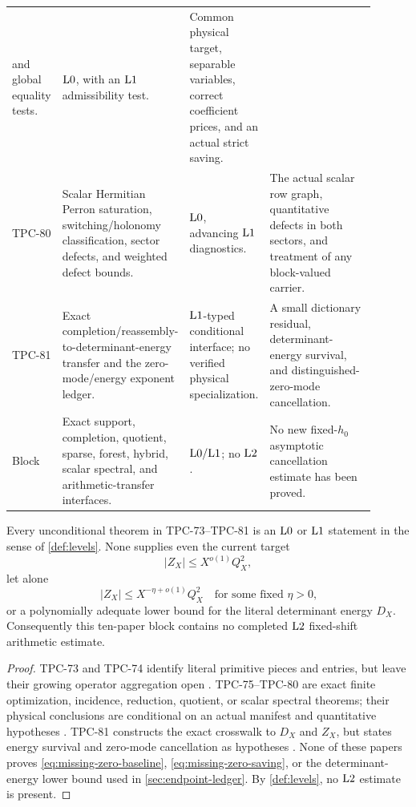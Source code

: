 \begin{longtable}{@{}p{0.075\linewidth}p{0.34\linewidth}
 p{0.135\linewidth}p{0.355\linewidth}@{}}
and global equality tests. &
\(\mathrm{L0}\), with an \(\mathrm{L1}\) admissibility test. &
Common physical target, separable variables, correct coefficient
prices, and an actual strict saving.
\\
TPC-80 &
Scalar Hermitian Perron saturation, switching/holonomy
classification, sector defects, and weighted defect bounds. &
\(\mathrm{L0}\), advancing \(\mathrm{L1}\) diagnostics. &
The actual scalar row graph, quantitative defects in both sectors,
and treatment of any block-valued carrier.
\\
TPC-81 &
Exact completion/reassembly-to-determinant-energy transfer and the
zero-mode/energy exponent ledger. &
\(\mathrm{L1}\)-typed conditional interface; no verified physical
specialization. &
A small dictionary residual, determinant-energy survival, and
distinguished-zero-mode cancellation.
\\
\midrule
Block &
Exact support, completion, quotient, sparse, forest, hybrid, scalar
spectral, and arithmetic-transfer interfaces. &
\(\mathrm{L0}/\mathrm{L1}\); no \(\mathrm{L2}\). &
No new fixed-\(h_0\) asymptotic cancellation estimate has been
proved.
\\
\bottomrule
\end{longtable}
\endgroup

\begin{theorem}
\label{thm:stage-audit}
Every unconditional theorem in TPC-73--TPC-81 is an \(\mathrm{L0}\) or
\(\mathrm{L1}\) statement in the sense of \cref{def:levels}.  None supplies
even the current target
\begin{equation}
 |Z_X|\le X^{o(1)}Q_X^2,
\label{eq:missing-zero-baseline}
\end{equation}
let alone
\begin{equation}
 |Z_X|\le X^{-\eta+o(1)}Q_X^2
 \quad\text{for some fixed \(\eta>0\),}
\label{eq:missing-zero-saving}
\end{equation}
or a polynomially adequate lower bound for the literal determinant
energy \(D_X\).  Consequently this ten-paper block contains no
completed \(\mathrm{L2}\) fixed-shift arithmetic estimate.
\end{theorem}

\begin{proof}
TPC-73 and TPC-74 identify literal primitive pieces and entries, but
leave their growing operator aggregation open
\citep{WangTPC73,WangTPC74}.  TPC-75--TPC-80 are exact finite
optimization, incidence, reduction, quotient, or scalar spectral
theorems; their physical conclusions are conditional on an actual
manifest and quantitative hypotheses
\citep{WangTPC75,WangTPC76,WangTPC77,WangTPC78,WangTPC79,WangTPC80}.
TPC-81 constructs the exact crosswalk to \(D_X\) and \(Z_X\), but
states energy survival and zero-mode cancellation as hypotheses
\citep{WangTPC81}.  None of these papers proves
\eqref{eq:missing-zero-baseline}, \eqref{eq:missing-zero-saving}, or
the determinant-energy lower bound
used in \cref{sec:endpoint-ledger}.  By
\cref{def:levels}, no \(\mathrm{L2}\) estimate is present.
\end{proof}

